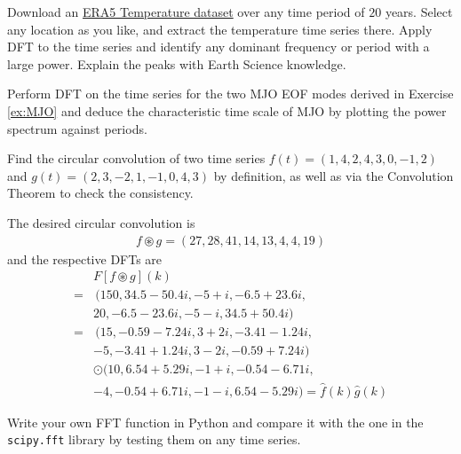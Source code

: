 \begin{Exercise}
Download an \href{https://cds.climate.copernicus.eu/datasets/reanalysis-era5-single-levels?tab=download}{ERA5 Temperature dataset} over any time period of $20$ years. Select any location as you like, and extract the temperature time series there. Apply DFT to the time series and identify any dominant frequency or period with a large power. Explain the peaks with Earth Science knowledge.
\end{Exercise}

\begin{Exercise}
Perform DFT on the time series for the two MJO EOF modes derived in Exercise \ref{ex:MJO} and deduce the characteristic time scale of MJO by plotting the power spectrum against periods.
\end{Exercise}

\begin{Exercise}
Find the circular convolution of two time series $f(t) = (1,4,2,4, \allowbreak 3,0,-1,2)$ and $g(t) = (2,3,-2,1,-1,0,4,3)$ by definition, as well as via the Convolution Theorem to check the consistency.
\end{Exercise}
\begin{Answer}
The desired circular convolution is
\begin{align*}
f \circledast g = (27, 28, 41, 14, 13, 4, 4, 19)
\end{align*}
and the respective DFTs are
\begin{align*}
& F[f \circledast g](k) \\
=&\, (150, 34.5-50.4i, -5+i, -6.5+23.6i, \\
& 20, -6.5-23.6i, -5-i, 34.5+50.4i) \\
=&\, (15, -0.59-7.24i, 3+2i, -3.41-1.24i, \\
& {-5}, -3.41+1.24i, 3-2i, -0.59+7.24i) \\
& \odot (10, 6.54+5.29i, -1+i, -0.54-6.71i, \\
& {-4}, -0.54+6.71i, -1-i, 6.54-5.29i) = \hat{f}(k)\hat{g}(k)
\end{align*}
\end{Answer}

\begin{Exercise}
Write your own FFT function in Python and compare it with the one in the \verb|scipy.fft| library by testing them on any time series.
\end{Exercise}